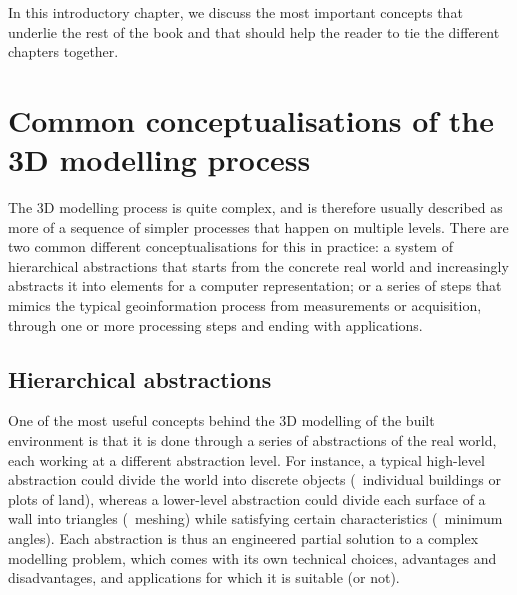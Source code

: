 


In this introductory chapter, we discuss the most important concepts that underlie the rest of the book and that should help the reader to tie the different chapters together.

\section{Common conceptualisations of the 3D modelling process}

The 3D modelling process is quite complex, and is therefore usually described as more of a sequence of simpler processes that happen on multiple levels.
There are two common different conceptualisations for this in practice: a system of hierarchical abstractions that starts from the concrete real world and increasingly abstracts it into elements for a computer representation; or a series of steps that mimics the typical geoinformation process from measurements or acquisition, through one or more processing steps and ending with applications.

\subsection{Hierarchical abstractions}

One of the most useful concepts behind the 3D modelling of the built environment is that it is done through a series of abstractions of the real world, each working at a different abstraction level.
For instance, a typical high-level abstraction could divide the world into discrete objects (\eg\ individual buildings or plots of land), whereas a lower-level abstraction could divide each surface of a wall into triangles (\ie\ meshing) while satisfying certain characteristics (\eg\ minimum angles).
Each abstraction is thus an engineered partial solution to a complex modelling problem, which comes with its own technical choices, advantages and disadvantages, and applications for which it is suitable (or not).

